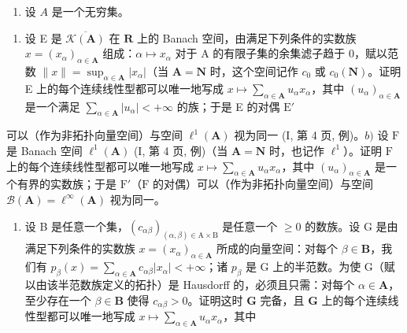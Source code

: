 \exercisegroup

\begin{enumerate}
\def\labelenumi{\arabic{enumi})}
\tightlist
\item
  设 \(A\) 是一个无穷集。
\end{enumerate}

\begin{enumerate}
\def\labelenumi{\alph{enumi})}
\tightlist
\item
  设 E 是 \(\overline{\mathcal{K}(\mathbf{A})}\) 在 \(\mathbf{R}\) 上的 Banach 空间，由满足下列条件的实数族 \(x = (x_{\alpha})_{\alpha \in \mathbf{A}}\) 组成：\(\alpha \mapsto x_{\alpha}\) 对于 A 的有限子集的余集滤子趋于 0，赋以范数 \(\| x\| = \sup_{\alpha \in \mathbf{A}}|x_{\alpha}|\)（当 \(\mathbf{A} = \mathbf{N}\) 时，这个空间记作 \(c_0\) 或 \(c_0(\mathbf{N})\)。证明 E 上的每个连续线性型都可以唯一地写成 \(x \mapsto \sum_{\alpha \in \mathbf{A}} u_{\alpha} x_{\alpha}\)，其中 \((u_{\alpha})_{\alpha \in \mathbf{A}}\) 是一个满足 \(\sum_{\alpha \in \mathbf{A}} |u_{\alpha}| < +\infty\) 的族；于是 E 的对偶 \(\mathrm{E}'\)
\end{enumerate}

可以（作为非拓扑向量空间）与空间 \(\ell^1 (\mathbf{A})\) 视为同一 (I, 第 4 页, 例)。\(b)\) 设 \(\mathrm{F}\) 是 Banach 空间 \(\ell^1 (\mathbf{A})\) (I, 第 4 页, 例)（当 \(\mathbf{A} = \mathbf{N}\) 时，也记作 \(\ell^1\)）。证明 \(\mathrm{F}\) 上的每个连续线性型都可以唯一地写成 \(x\mapsto \sum_{\alpha \in \mathbf{A}}u_{\alpha}x_{\alpha}\)，其中 \((u_{\alpha})_{\alpha \in \mathbf{A}}\) 是一个有界的实数族；于是 \(\mathrm{F}'\)（\(\mathrm{F}\) 的对偶）可以（作为非拓扑向量空间）与空间 \(\mathcal{B}(\mathbf{A}) = \ell^{\infty}(\mathbf{A})\) 视为同一。

\begin{enumerate}
\def\labelenumi{\alph{enumi})}
\setcounter{enumi}{2}
\tightlist
\item
  设 B 是任意一个集，\((c_{\alpha \beta})_{(\alpha ,\beta)\in \mathrm{A}\times \mathrm{B}}\) 是任意一个 \(\geqslant 0\) 的数族。设 G 是由满足下列条件的实数族 \(x = (x_{\alpha})_{\alpha \in \mathbf{A}}\) 所成的向量空间：对每个 \(\beta \in \mathbf{B}\)，我们有 \(p_{\beta}(x) = \sum_{\alpha \in \mathbf{A}}c_{\alpha \beta}|x_{\alpha}| < + \infty\)；诸 \(p_{\beta}\) 是 G 上的半范数。为使 G（赋以由该半范数族定义的拓扑）是 Hausdorff 的，必须且只需：对每个 \(\alpha \in \mathbf{A}\)，至少存在一个 \(\beta \in \mathbf{B}\) 使得 \(c_{\alpha \beta} > 0\)。证明这时 \(\mathbf{G}\) 完备，且 \(\mathbf{G}\) 上的每个连续线性型都可以唯一地写成 \(x \mapsto \sum_{\alpha \in \mathbf{A}} u_{\alpha} x_{\alpha}\)，其中
\end{enumerate}

